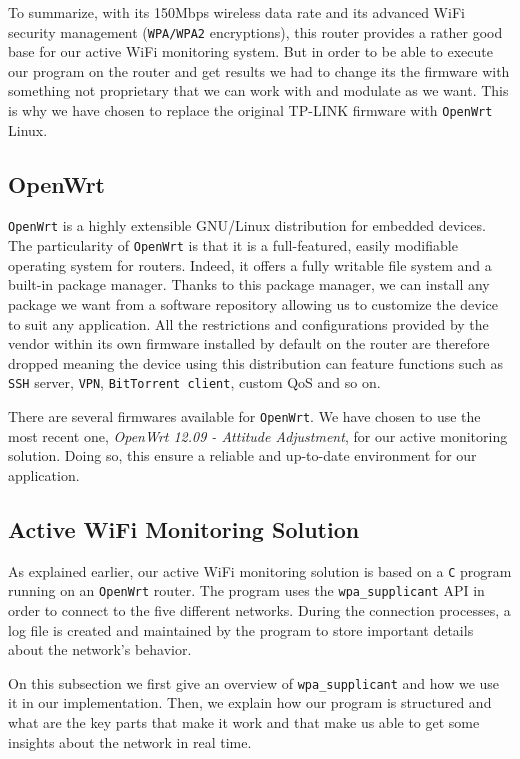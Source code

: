 To summarize, with its 150Mbps wireless data rate and its advanced WiFi security management (\texttt{WPA/WPA2} encryptions), this router provides a rather good base for our active WiFi monitoring system. But in order to be able to execute our program on the router and get results we had to change its the firmware with something not proprietary that we can work with and modulate as we want. This is why we have chosen to replace the original TP-LINK firmware with \texttt{OpenWrt} Linux.


\subsection{OpenWrt}
\texttt{OpenWrt} \cite{openwrt} is a highly extensible GNU/Linux distribution for embedded devices. The particularity of \texttt{OpenWrt} is that it is a full-featured, easily modifiable operating system for routers. Indeed, it offers a fully writable file system and a built-in package manager. Thanks to this package manager, we can install any package we want from a software repository allowing us to customize the device to suit any application. All the restrictions and configurations provided by the vendor within its own firmware installed by default on the router are therefore dropped meaning the device using this distribution can feature functions such as \texttt{SSH} server, \texttt{VPN}, \texttt{BitTorrent client}, custom QoS and so on.

There are several firmwares available for \texttt{OpenWrt}. We have chosen to use the most recent one, \textit{OpenWrt 12.09 - Attitude Adjustment}, for our active monitoring solution. Doing so, this ensure a reliable and up-to-date environment for our application.


\subsection{Active WiFi Monitoring Solution}
As explained earlier, our active WiFi monitoring solution is based on a \texttt{C} program running on an \texttt{OpenWrt} router. The program uses the \texttt{wpa\_supplicant} API in order to connect to the five different networks. During the connection processes, a log file is created and maintained by the program to store important details about the network's behavior. 

On this subsection we first give an overview of \texttt{wpa\_supplicant} and how we use it in our implementation. Then, we explain how our program is structured and what are the key parts that make it work and that make us able to get some insights about the network in real time.

